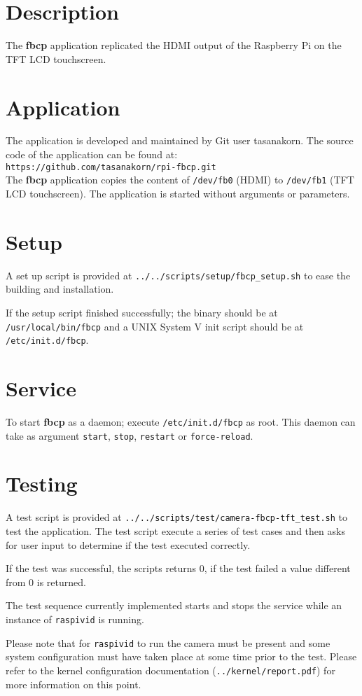 \section{Description}
The \textbf{fbcp} application replicated the HDMI output of the Raspberry Pi on
the TFT LCD touchscreen.

\section{Application}
The application is developed and maintained by Git user tasanakorn. The source
code of the application can be found at:\\

\texttt{https://github.com/tasanakorn/rpi-fbcp.git}\\

The \textbf{fbcp} application copies the content of \texttt{/dev/fb0} (HDMI) to
\texttt{/dev/fb1} (TFT LCD touchscreen). The application is started without
arguments or parameters.

\section{Setup}
A set up script is provided at \texttt{../../scripts/setup/fbcp\_setup.sh} to
ease the building and installation.

If the setup script finished successfully; the binary should be at\\
\texttt{/usr/local/bin/fbcp} and a UNIX System V init script should be at\\
\texttt{/etc/init.d/fbcp}.

\section{Service}
To start \textbf{fbcp} as a daemon; execute \texttt{/etc/init.d/fbcp}
as root. This daemon can take as argument \texttt{start}, \texttt{stop},
\texttt{restart} or \texttt{force-reload}.

\section{Testing}
A test script is provided at
\texttt{../../scripts/test/camera-fbcp-tft\_test.sh} to test the application.
The test script execute a series of test cases and then asks for user input to
determine if the test executed correctly.

If the test was successful, the scripts returns 0, if the test failed a value
different from 0 is returned.

The test sequence currently implemented starts and stops the service while an
instance of \texttt{raspivid} is running.

Please note that for \texttt{raspivid} to run the camera must be present and
some system configuration must have taken place at some time prior to the test.
Please refer to the kernel configuration documentation
(\texttt{../kernel/report.pdf}) for more information on this point.
